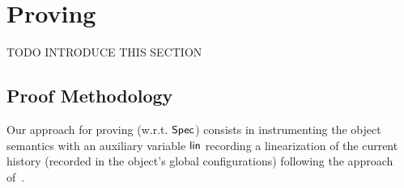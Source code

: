 \section{Proving \CRDTLin{}}
\label{sec:proofs}


TODO INTRODUCE THIS SECTION

\subsection{Proof Methodology}\label{ssec:proof-methodology}

Our approach for proving \CRDTLin{} (w.r.t. $\mathsf{Spec}{}$) consists in
instrumenting the object semantics with an auxiliary variable
$\mathsf{lin}$ recording a linearization of the current history (recorded
in the object's global configurations) following the approach
of~\cite{VafeiadisHHS06,more citations}.

